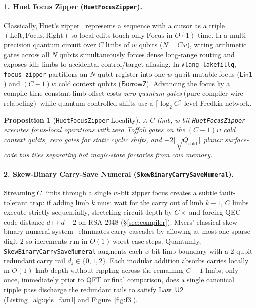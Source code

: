 \documentclass[acmsmall,screen,anonymous]{acmart}
\DeclareRobustCommand{\_}{\ifmmode\text{\char95}\else\char95\penalty0\relax\fi}
\theoremstyle{plain}
\newtheorem{proposition}[theorem]{Proposition}
\newcommand{\CapBorrowZ}{\ensuremath{\mathsf{BorrowZ}}}
\newcommand{\CapLin}{\ensuremath{\mathsf{Lin1}}}
\begin{document}
\paragraph{1. Huet Focus Zipper (\texttt{HuetFocusZipper}).}
Classically, Huet's zipper~\cite{huet1997} represents a sequence with a cursor as a triple $(\mathrm{Left}, \mathrm{Focus}, \mathrm{Right})$ so local edits touch only $\mathrm{Focus}$ in $O(1)$ time. In a multi-precision quantum circuit over $C$ limbs of $w$ qubits ($N = C w$), wiring arithmetic gates across all $N$ qubits simultaneously forces dense long-range routing and exposes idle limbs to accidental control/target aliasing. In \texttt{\#lang lakefillq}, \texttt{focus-zipper} partitions an $N$-qubit register into one $w$-qubit mutable focus ($\CapLin$) and $(C-1)w$ cold context qubits ($\CapBorrowZ$). Advancing the focus by a compile-time constant limb offset costs \emph{zero quantum gates} (pure compiler wire relabeling), while quantum-controlled shifts use a $\lceil \log_2 C \rceil$-level Fredkin network.

\begin{proposition}[\texttt{HuetFocusZipper} Locality]
\label{prop:p3_1}
A $C$-limb, $w$-bit \texttt{HuetFocusZipper} executes focus-local operations with zero Toffoli gates on the $(C-1)w$ cold context qubits, zero gates for static cyclic shifts, and $+2\lceil\sqrt{Q_{\mathrm{cold}}}\rceil$ planar surface-code bus tiles separating hot magic-state factories from cold memory.
\end{proposition}

\paragraph{2. Skew-Binary Carry-Save Numeral (\texttt{SkewBinaryCarrySaveNumeral}).}
Streaming $C$ limbs through a single $w$-bit zipper focus creates a subtle fault-tolerant trap: if adding limb $k$ must wait for the carry out of limb $k-1$, $C$ limbs execute strictly sequentially, stretching circuit depth by $C\times$ and forcing QEC code distance $d \mapsto d + 2$ on RSA-2048 (\S\ref{sec:compiler}). Myers' classical skew-binary numeral system~\cite{myers1983,okasaki1998} eliminates carry cascades by allowing at most one sparse digit $2$ so increments run in $O(1)$ worst-case steps. Quantumly, \texttt{SkewBinaryCarrySaveNumeral} augments each $w$-bit limb boundary with a 2-qubit redundant carry rail $d_k \in \{0, 1, 2\}$. Each modular addition absorbs carries locally in $O(1)$ limb depth without rippling across the remaining $C-1$ limbs; only once, immediately prior to QFT or final comparison, does a single canonical ripple pass discharge the redundant rails to satisfy Law~$\mathsf{U2}$ (Listing~\ref{alg:qds_fam1} and Figure~\ref{fig:f3}).
\end{document}
